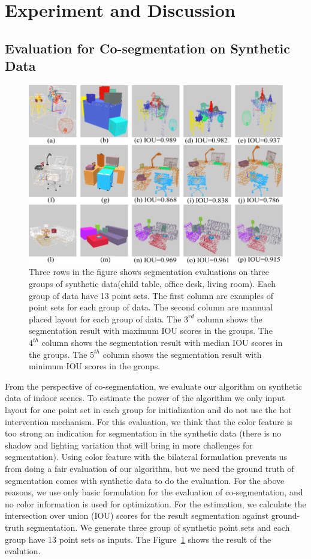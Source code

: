 \section{Experiment and Discussion}
\subsection{Evaluation for Co-segmentation on Synthetic Data}
\begin{figure}[htb]
	\centering
	\includegraphics[width=\linewidth]{images/seg/seg}
	\caption{\label{fig:seg}Three rows in the figure shows segmentation evaluations on three groups of synthetic data(child table, office desk, living room). Each group of data have 13 point sets. The first column are examples of point sets for each group of data. The second column are mannual placed layout for each group of data. The $3^{rd}$ column shows the segmentation result with maximum IOU scores in the groups. The $4^{th}$ column shows the segmentation result with median IOU scores in the groups. The $5^{th}$ column shows the segmentation result with minimum IOU scores in the groups.}
\end{figure}
From the perspective of co-segmentation, we evaluate our algorithm on synthetic data of indoor scenes. To estimate the power of the algorithm we only input layout for one point set in each group for initialization and do not use the hot intervention mechanism. For this evaluation, we think that the color feature is too strong an indication for segmentation in the synthetic data (there is no shadow and lighting variation that will bring in more challenges for segmentation). Using color feature with the bilateral formulation prevents us from doing a fair evaluation of our algorithm, but we need the ground truth of segmentation comes with synthetic data to do the evaluation. For the above reasons, we use only basic formulation for the evaluation of co-segmentation, and no color information is used for optimization. For the estimation, we calculate the intersection over union (IOU) scores for the result segmentation against ground-truth segmentation. We generate three group of synthetic point sets and each group have 13 point sets as inputs. The Figure~\ref{fig:seg} shows the result of the evalution.\\
